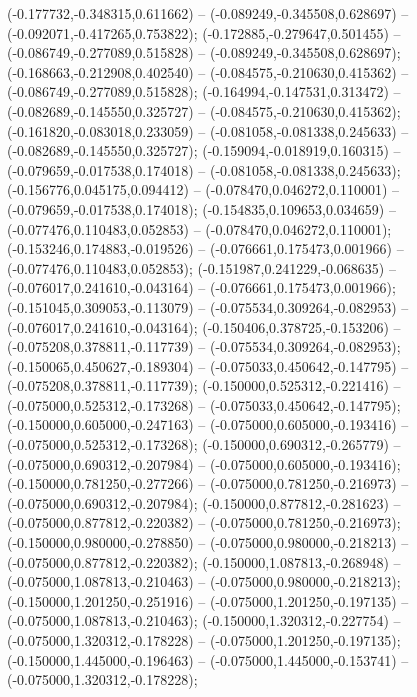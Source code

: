  (-0.177732,-0.348315,0.611662) -- (-0.089249,-0.345508,0.628697) -- (-0.092071,-0.417265,0.753822);
 (-0.172885,-0.279647,0.501455) -- (-0.086749,-0.277089,0.515828) -- (-0.089249,-0.345508,0.628697);
 (-0.168663,-0.212908,0.402540) -- (-0.084575,-0.210630,0.415362) -- (-0.086749,-0.277089,0.515828);
 (-0.164994,-0.147531,0.313472) -- (-0.082689,-0.145550,0.325727) -- (-0.084575,-0.210630,0.415362);
 (-0.161820,-0.083018,0.233059) -- (-0.081058,-0.081338,0.245633) -- (-0.082689,-0.145550,0.325727);
 (-0.159094,-0.018919,0.160315) -- (-0.079659,-0.017538,0.174018) -- (-0.081058,-0.081338,0.245633);
 (-0.156776,0.045175,0.094412) -- (-0.078470,0.046272,0.110001) -- (-0.079659,-0.017538,0.174018);
 (-0.154835,0.109653,0.034659) -- (-0.077476,0.110483,0.052853) -- (-0.078470,0.046272,0.110001);
 (-0.153246,0.174883,-0.019526) -- (-0.076661,0.175473,0.001966) -- (-0.077476,0.110483,0.052853);
 (-0.151987,0.241229,-0.068635) -- (-0.076017,0.241610,-0.043164) -- (-0.076661,0.175473,0.001966);
 (-0.151045,0.309053,-0.113079) -- (-0.075534,0.309264,-0.082953) -- (-0.076017,0.241610,-0.043164);
 (-0.150406,0.378725,-0.153206) -- (-0.075208,0.378811,-0.117739) -- (-0.075534,0.309264,-0.082953);
 (-0.150065,0.450627,-0.189304) -- (-0.075033,0.450642,-0.147795) -- (-0.075208,0.378811,-0.117739);
 (-0.150000,0.525312,-0.221416) -- (-0.075000,0.525312,-0.173268) -- (-0.075033,0.450642,-0.147795);
 (-0.150000,0.605000,-0.247163) -- (-0.075000,0.605000,-0.193416) -- (-0.075000,0.525312,-0.173268);
 (-0.150000,0.690312,-0.265779) -- (-0.075000,0.690312,-0.207984) -- (-0.075000,0.605000,-0.193416);
 (-0.150000,0.781250,-0.277266) -- (-0.075000,0.781250,-0.216973) -- (-0.075000,0.690312,-0.207984);
 (-0.150000,0.877812,-0.281623) -- (-0.075000,0.877812,-0.220382) -- (-0.075000,0.781250,-0.216973);
 (-0.150000,0.980000,-0.278850) -- (-0.075000,0.980000,-0.218213) -- (-0.075000,0.877812,-0.220382);
 (-0.150000,1.087813,-0.268948) -- (-0.075000,1.087813,-0.210463) -- (-0.075000,0.980000,-0.218213);
 (-0.150000,1.201250,-0.251916) -- (-0.075000,1.201250,-0.197135) -- (-0.075000,1.087813,-0.210463);
 (-0.150000,1.320312,-0.227754) -- (-0.075000,1.320312,-0.178228) -- (-0.075000,1.201250,-0.197135);
 (-0.150000,1.445000,-0.196463) -- (-0.075000,1.445000,-0.153741) -- (-0.075000,1.320312,-0.178228);
